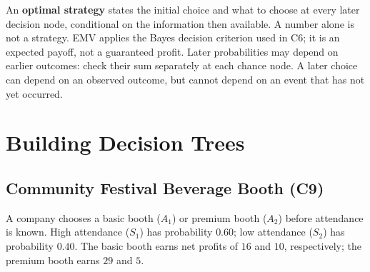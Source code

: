 An \textbf{optimal strategy} states the initial choice and what to choose at every later decision node, conditional on the information then available. A number alone is not a strategy. EMV applies the Bayes decision criterion used in C6; it is an expected payoff, not a guaranteed profit. Later probabilities may depend on earlier outcomes: check their sum separately at each chance node. A later choice can depend on an observed outcome, but cannot depend on an event that has not yet occurred.

\section{Building Decision Trees}\label{sec:building}

\subsection{Community Festival Beverage Booth (C9)}\label{sec:booth}
A company chooses a basic booth ($A_1$) or premium booth ($A_2$) before attendance is known. High attendance ($S_1$) has probability $0.60$; low attendance ($S_2$) has probability $0.40$. The basic booth earns net profits of $16$ and $10$, respectively; the premium booth earns $29$ and $5$.

